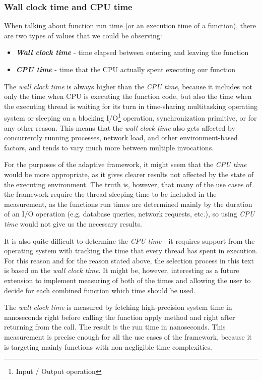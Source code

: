 \subsubsection{Wall clock time and CPU time}

When talking about function run time (or an execution time of a function), there are two types of values that we could be observing:

\begin{itemize}
	\item \textbf{\textit{Wall clock time}} - time elapsed between entering and leaving the function
	\item \textbf{\textit{CPU time}} - time that the CPU actually spent executing our function
\end{itemize}

The \textit{wall clock time} is always higher than the \textit{CPU time}, because it includes not only the time when CPU is executing the function code, but also the time when the executing thread is waiting for its turn in time-sharing multitasking operating system or sleeping on a blocking I/O\footnote{Input / Output operation} operation, synchronization primitive, or for any other reason. This means that the \textit{wall clock time} also gets affected by concurrently running processes, network load, and other environment-based factors, and tends to vary much more between multiple invocations.

For the purposes of the adaptive framework, it might seem that the \textit{CPU time} would be more appropriate, as it gives clearer results not affected by the state of the executing environment. The truth is, however, that many of the use cases of the framework require the thread sleeping time to be included in the measurement, as the functions run times are determined mainly by the duration of an I/O operation (e.g. database queries, network requests, etc.), so using \textit{CPU time} would not give us the necessary results.

It is also quite difficult to determine the \textit{CPU time} - it requires support from the operating system with tracking the time that every thread has spent in execution. For this reason and for the reason stated above, the selection process in this text is based on the \textit{wall clock time}. It might be, however, interesting as a future extension to implement measuring of both of the times and allowing the user to decide for each combined function which time should be used.

The \textit{wall clock time} is measured by fetching high-precision system time in nanoseconds right before calling the function apply method and right after returning from the call. The result is the run time in nanoseconds. This measurement is precise enough for all the use cases of the framework, because it is targeting mainly functions with non-negligible time complexities.

